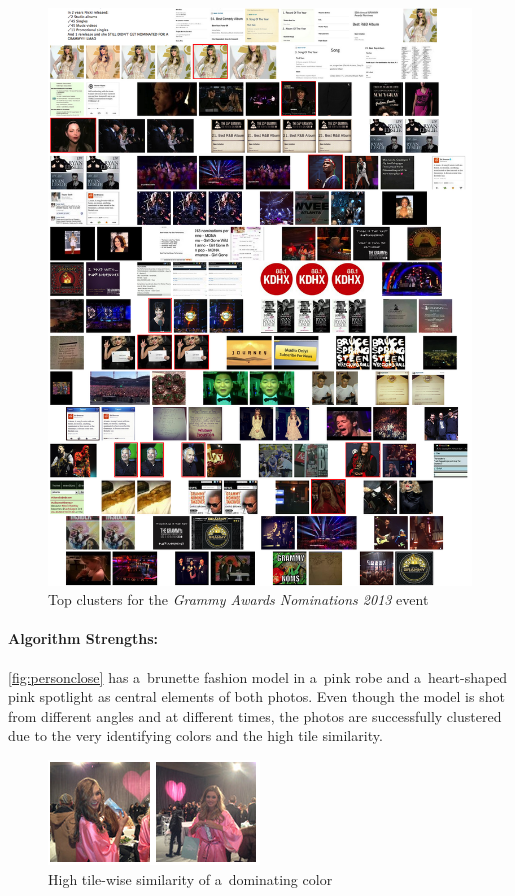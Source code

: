 \begin{figure}[h!]
  \centering
  \includegraphics[width=0.97\linewidth]{./grammy_clusters.png}
  \caption{Top clusters for the \emph{Grammy Awards Nominations 2013} event}
  \label{fig:topgrammy}
\end{figure}

\paragraph{Algorithm Strengths:} 

\autoref{fig:personclose} has a~brunette fashion model in a~pink robe
and a~heart-shaped pink spotlight as central elements of both photos. 
Even though the model is shot from different angles and at different times,
the photos are successfully clustered due to the very identifying colors
and the high tile similarity. 

\begin{figure}[h!]
  \centering
  \includegraphics[width=0.4\linewidth]{./person.png}
  \caption{High tile-wise similarity of a~dominating color}
  \label{fig:personclose}
\end{figure}

